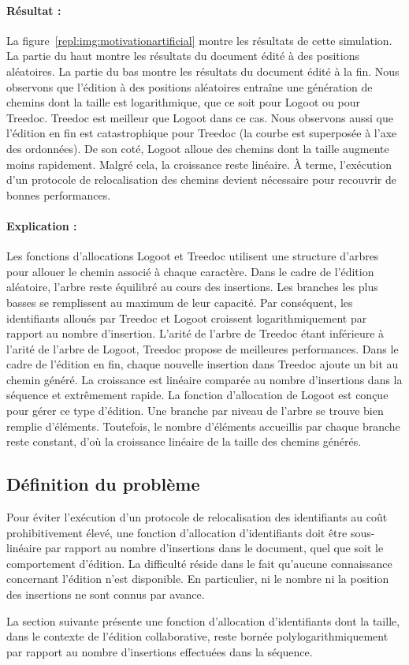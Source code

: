 \paragraph{Résultat :} La figure~\ref{repl:img:motivationartificial} montre les
résultats de cette simulation. La partie du haut montre les résultats du
document édité à des positions aléatoires. La partie du bas montre les résultats
du document édité à la fin. Nous observons que l'édition à des positions
aléatoires entraîne une génération de chemins dont la taille est logarithmique,
que ce soit pour Logoot ou pour Treedoc. Treedoc est meilleur que Logoot dans ce
cas. Nous observons aussi que l'édition en fin est catastrophique pour Treedoc
(la courbe est superposée à l'axe des ordonnées). De son coté, Logoot alloue des
chemins dont la taille augmente moins rapidement. Malgré cela, la croissance
reste linéaire. À terme, l'exécution d'un protocole de relocalisation des
chemins devient nécessaire pour recouvrir de bonnes performances.

\paragraph{Explication :} Les fonctions d'allocations Logoot et Treedoc
utilisent une structure d'arbres pour allouer le chemin associé à chaque
caractère. Dans le cadre de l'édition aléatoire, l'arbre reste équilibré au
cours des insertions. Les branches les plus basses se remplissent au maximum de
leur capacité. Par conséquent, les identifiants alloués par Treedoc et Logoot
croissent logarithmiquement par rapport au nombre d'insertion. L'arité de
l'arbre de Treedoc étant inférieure à l'arité de l'arbre de Logoot, Treedoc
propose de meilleures performances. Dans le cadre de l'édition en fin, chaque
nouvelle insertion dans Treedoc ajoute un bit au chemin généré. La croissance
est linéaire comparée au nombre d'insertions dans la séquence et extrêmement
rapide. La fonction d'allocation de Logoot est conçue pour gérer ce type
d'édition. Une branche par niveau de l'arbre se trouve bien remplie
d'éléments. Toutefois, le nombre d'éléments accueillis par chaque branche reste
constant, d'où la croissance linéaire de la taille des chemins générés.

\subsection{Définition du problème}

Pour éviter l'exécution d'un protocole de relocalisation des identifiants au
coût prohibitivement élevé, une fonction d'allocation d'identifiants doit être
sous-linéaire par rapport au nombre d'insertions dans le document, quel que soit
le comportement d'édition. La difficulté réside dans le fait qu'aucune
connaissance concernant l'édition n'est disponible. En particulier, ni le nombre
ni la position des insertions ne sont connus par avance.

La section suivante présente une fonction d'allocation d'identifiants dont la
taille, dans le contexte de l'édition collaborative, reste bornée
polylogarithmiquement par rapport au nombre d'insertions effectuées dans la
séquence.

